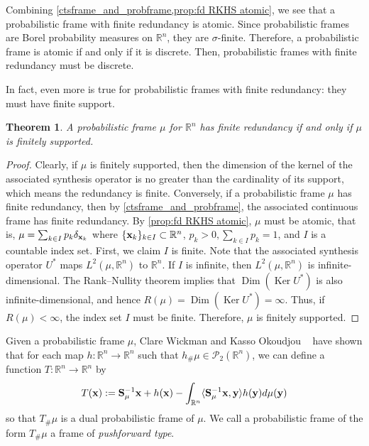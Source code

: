 \documentclass{amsart}
\numberwithin{equation}{section}
\DeclareMathOperator{\kernel}{Ker}
\DeclareMathOperator{\Dim}{Dim}
\theoremstyle{plain}
\newtheorem{theorem}{Theorem}[section]
\theoremstyle{remark}
\theoremstyle{definition}
\begin{document}
Combining \cref{ctsframe_and_probframe,prop:fd RKHS atomic}, we see that a probabilistic frame with finite redundancy is atomic. Since probabilistic frames are Borel probability measures on $\mathbb{R}^n$, they are $\sigma$-finite. Therefore, a probabilistic frame is atomic if and only if it is discrete. Then, probabilistic frames with finite redundancy must be discrete.

In fact, even more is true for probabilistic frames with finite redundancy: they must have finite support.


\begin{theorem}\label{thm:finredfinsupp}
A probabilistic frame $\mu$ for $\mathbb{R}^n$ has finite redundancy if and only if  $\mu$ is finitely supported.
\end{theorem}
\begin{proof}
Clearly,  if $\mu$ is finitely supported, then the dimension of the kernel of the associated synthesis operator is no greater than the cardinality of its support, which means the redundancy is finite. Conversely, if a probabilistic frame $\mu$ has finite redundancy, then by \cref{ctsframe_and_probframe}, the associated continuous frame has finite redundancy. By \cref{prop:fd RKHS atomic},
$\mu$ must be atomic, that is, $\mu = \sum_{k\in I} p_k \delta_{{\bf x}_k}$ where $\{{\bf x}_k\}_{k\in I} \subset \mathbb{R}^n$, $p_k>0, \sum_{k\in I} p_k = 1$, and $I$ is a countable index set. First, we claim $I$ is finite. Note that the associated synthesis operator
$U^*$ maps $L^2(\mu, \mathbb{R}^n)$ to $\mathbb{R}^n$. If $I$ is infinite, then $L^2(\mu, \mathbb{R}^n)$ is infinite-dimensional. The Rank–Nullity theorem implies that $\Dim(\kernel U^*)$ is also infinite-dimensional, and hence $R(\mu) = \Dim(\kernel U^*) = \infty$. Thus, if $R(\mu) < \infty$, the index set $I$ must be finite. Therefore, $\mu$ is finitely supported. 
\end{proof}

Given a probabilistic frame $\mu$, Clare Wickman and Kasso Okoudjou ~\cite{wickman2017duality} have shown that for each map $h: \mathbb{R}^n \rightarrow \mathbb{R}^n$ such that $h_\# \mu \in \mathcal{P}_2(\mathbb{R}^n)$, we can define a function $T:\mathbb{R}^n \rightarrow \mathbb{R}^n$ by
      \begin{equation*}
          T({\bf x}) := {{\bf S}_\mu^{-1}}{\bf x} + h({\bf x}) - \int_{\mathbb{R}^n} \langle {\bf S}_\mu^{-1}{\bf x}, {\bf y} \rangle h({\bf y}) d\mu({\bf y})
      \end{equation*}
so that $T_\# \mu$ is a dual probabilistic frame of $\mu$. We call a probabilistic frame of the form $T_\#\mu$ a frame of \emph{pushforward type}.
\end{document}
